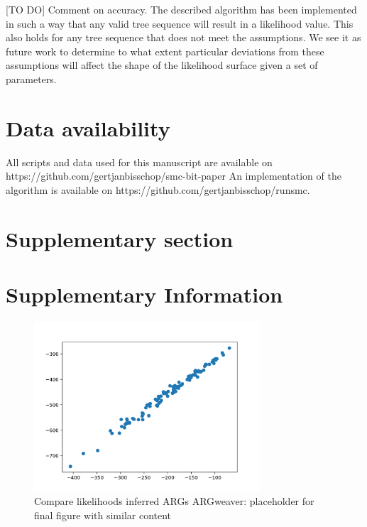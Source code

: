 \documentclass{article}
\newcommand{\supplementarysection}{%
  \setcounter{figure}{0}%
  \let\oldthefigure\thefigure%
  \renewcommand{\thefigure}{S\oldthefigure}%
  \section{Supplementary section}%
}
\begin{document}
[TO DO] Comment on accuracy. The described algorithm has been implemented in such a way that 
any valid tree sequence will result in a likelihood value. This also holds for any tree sequence 
that does not meet the assumptions. We see it as future work to determine to what extent 
particular deviations from these assumptions will affect the shape of the likelihood surface given 
a set of parameters.



\section{Data availability}

All scripts and data used for this manuscript are available on https://github.com/gertjanbisschop/smc-bit-paper
An implementation of the algorithm is available on https://github.com/gertjanbisschop/runsmc.




\pagebreak 

\supplementarysection
\section*{Supplementary Information}


\begin{figure}[!ht]
\centering
\includegraphics[width=0.75\textwidth]{figures/supplementary-figs/argweaver_vs_runsmc.png}
\caption{Compare likelihoods inferred ARGs ARGweaver: placeholder for final figure with similar content}
 \label{sup:fig:vs-argweaver}
\end{figure}
\end{document}
